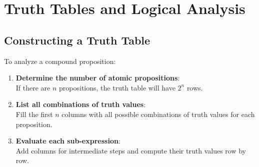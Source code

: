 \documentclass[
]{book}
\theoremstyle{definition}
\theoremstyle{definition}
\theoremstyle{definition}
\theoremstyle{definition}
\theoremstyle{remark}
\begin{document}
\section{Truth Tables and Logical Analysis}\label{truth-tables-and-logical-analysis}

\subsection{Constructing a Truth Table}\label{constructing-a-truth-table}

To analyze a compound proposition:

\begin{enumerate}
\def\labelenumi{\arabic{enumi}.}
\item
  \textbf{Determine the number of atomic propositions}:\\
  If there are \(n\) propositions, the truth table will have \(2^n\) rows.
\item
  \textbf{List all combinations of truth values}:\\
  Fill the first \(n\) columns with all possible combinations of truth values for each proposition.
\item
  \textbf{Evaluate each sub-expression}:\\
  Add columns for intermediate steps and compute their truth values row by row.
\end{enumerate}
\end{document}
